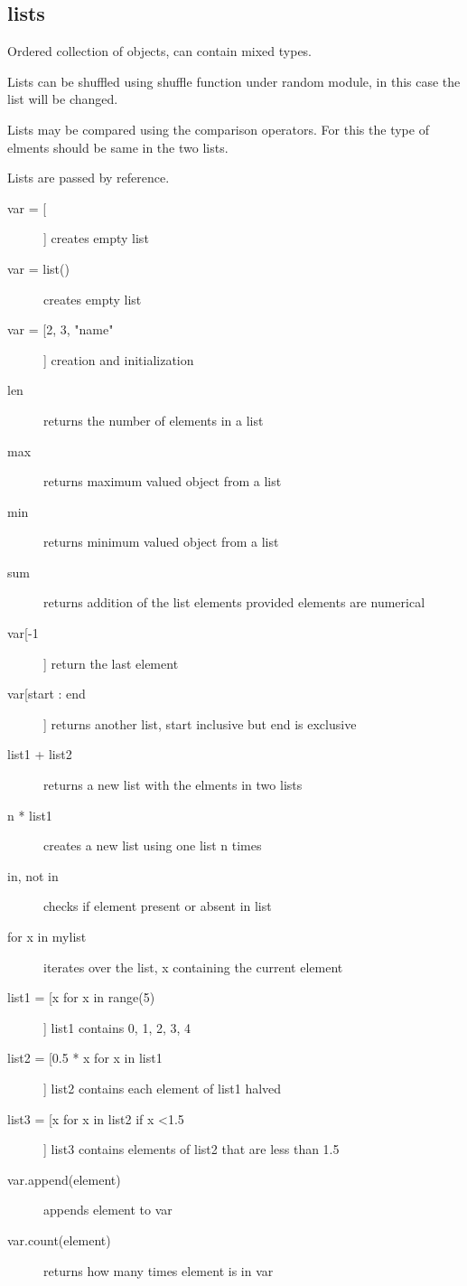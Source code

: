 \documentclass[a4paper, 12pt]{article}
\begin{document}
\subsection{lists}
Ordered collection of objects, can contain mixed types.

Lists can be shuffled using shuffle function under random module, in this case the list will be changed.

Lists may be compared using the comparison operators. For this the type of elments should be same in the two lists.

Lists are passed by reference.

\begin{description}
\item[var = []] creates empty list
\item[var = list()] creates empty list
\item[var = [2, 3, "name"]] creation and initialization
\item[len] returns the number of elements in a list
\item[max] returns maximum valued object from a list
\item[min] returns minimum valued object from a list
\item[sum] returns addition of the list elements provided elements are numerical
\item[var[-1]] return the last element
\item[var[start : end]] returns another list, start inclusive but end is exclusive
\item[list1 + list2] returns a new list with the elments in two lists
\item[n * list1] creates a new list using one list n times
\item[in, not in] checks if element present or absent in list
\item[for x in mylist] iterates over the list, x containing the current element
\item[list1 = [x for x in range(5)]] list1 contains 0, 1, 2, 3, 4
\item[list2 = [0.5 * x for x in list1]] list2 contains each element of list1 halved
\item[list3 = [x for x in list2 if x \textless 1.5]] list3 contains elements of list2 that are less than 1.5
\item[var.append(element)] appends element to var
\item[var.count(element)] returns how many times element is in var

\end{description}
\end{document}
